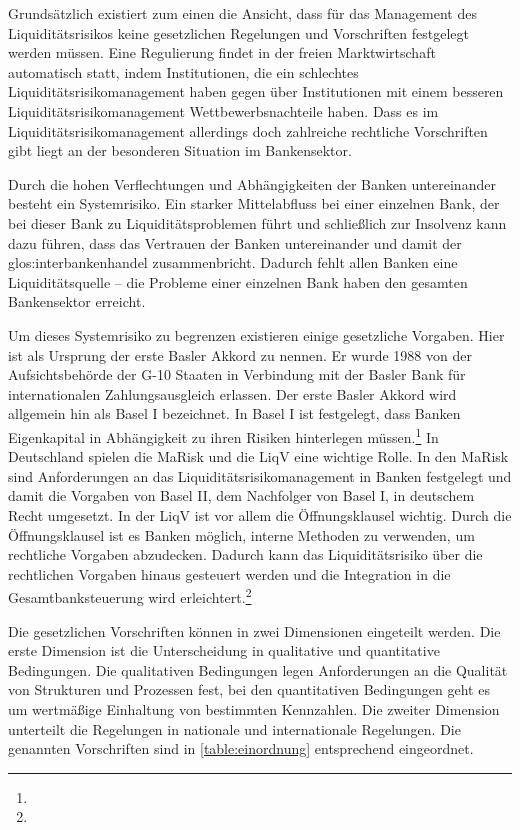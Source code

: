 Grundsätzlich existiert zum einen die Ansicht, dass für das Management des Liquiditätsrisikos keine gesetzlichen Regelungen und Vorschriften festgelegt werden müssen. Eine Regulierung findet in der freien Marktwirtschaft automatisch statt, indem Institutionen, die ein schlechtes Liquiditätsrisikomanagement haben gegen über Institutionen mit einem besseren Liquiditätsrisikomanagement Wettbewerbsnachteile haben. Dass es im Liquiditätsrisikomanagement allerdings doch zahlreiche rechtliche Vorschriften gibt liegt an der besonderen Situation im Bankensektor. 

Durch die hohen Verflechtungen und Abhängigkeiten der Banken untereinander besteht ein Systemrisiko. Ein starker Mittelabfluss bei einer einzelnen Bank, der bei dieser Bank zu Liquiditätsproblemen führt und schließlich zur Insolvenz kann dazu führen, dass das Vertrauen der Banken untereinander und damit der \gls{glos:interbankenhandel} zusammenbricht. Dadurch fehlt allen Banken eine Liquiditätsquelle -- die Probleme einer einzelnen Bank haben den gesamten Bankensektor erreicht.

Um dieses Systemrisiko zu begrenzen existieren einige gesetzliche Vorgaben. Hier ist als Ursprung der erste Basler Akkord zu nennen. Er wurde 1988 von der Aufsichtsbehörde der G-10 Staaten in Verbindung mit der Basler Bank für internationalen Zahlungsausgleich erlassen. Der erste Basler Akkord wird allgemein hin als Basel I bezeichnet. In Basel I ist festgelegt, dass Banken Eigenkapital in Abhängigkeit zu ihren Risiken hinterlegen müssen.\footnote{ } In Deutschland spielen die \gls{MaRisk} und die \gls{LiqV} eine wichtige Rolle. In den \gls{MaRisk} sind Anforderungen an das Liquiditätsrisikomanagement in Banken festgelegt und damit die Vorgaben von Basel II, dem Nachfolger von Basel I, in deutschem Recht umgesetzt. In der \gls{LiqV} ist vor allem die Öffnungsklausel wichtig. Durch die Öffnungsklausel ist es Banken möglich, interne Methoden zu verwenden, um rechtliche Vorgaben abzudecken. Dadurch kann das Liquiditätsrisiko über die rechtlichen Vorgaben hinaus gesteuert werden und die Integration in die Gesamtbanksteuerung wird erleichtert.\footnote{ }

Die gesetzlichen Vorschriften können in zwei Dimensionen eingeteilt werden. Die erste Dimension ist die Unterscheidung in qualitative und quantitative Bedingungen. Die qualitativen Bedingungen legen Anforderungen an die Qualität von Strukturen und Prozessen fest, bei den quantitativen Bedingungen geht es um wertmäßige Einhaltung von bestimmten Kennzahlen. Die zweiter Dimension unterteilt die Regelungen in nationale und internationale Regelungen. Die genannten Vorschriften sind in \vref{table:einordnung} entsprechend eingeordnet. 

